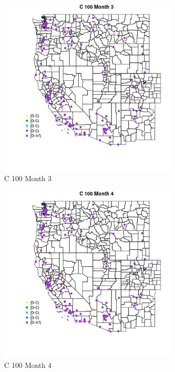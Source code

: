 \begin{figure} 
\centering  
\includegraphics[width=0.77\textwidth]{Code_Outputs/Report_ML_input_PM25_Step4_part_e_de_duplicated_aves_MapObsMo3C_100.jpg} 
\caption{\label{fig:Report_ML_input_PM25_Step4_part_e_de_duplicated_avesMapObsMo3C_100}C 100 Month 3} 
\end{figure} 
 

\begin{figure} 
\centering  
\includegraphics[width=0.77\textwidth]{Code_Outputs/Report_ML_input_PM25_Step4_part_e_de_duplicated_aves_MapObsMo4C_100.jpg} 
\caption{\label{fig:Report_ML_input_PM25_Step4_part_e_de_duplicated_avesMapObsMo4C_100}C 100 Month 4} 
\end{figure} 
 

